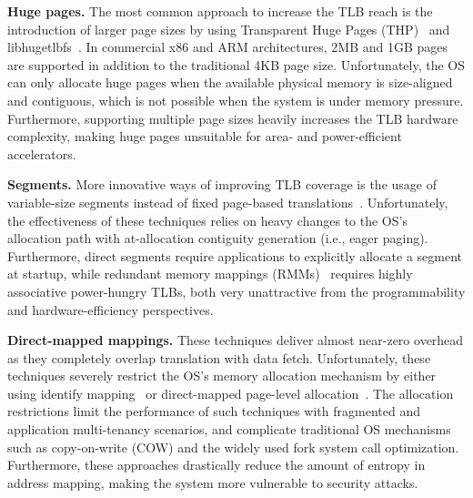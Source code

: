 \noindent\textbf{Huge pages.} The most common approach to increase the TLB reach is the introduction of larger page sizes by using Transparent Huge Pages (THP)~\cite{transparenthugepages} and libhugetlbfs~\cite{lighugetlbfs}. In commercial x86 and ARM architectures, 2MB and 1GB pages are supported in addition to the traditional 4KB page size. Unfortunately, the OS can only allocate huge pages when the available physical memory is size-aligned and contiguous, which is not possible when the system is under memory pressure. Furthermore, supporting multiple page sizes heavily increases the TLB hardware complexity, making huge pages unsuitable for area- and power-efficient accelerators.

\noindent\textbf{Segments.} More innovative ways of improving TLB coverage is the usage of variable-size segments instead of fixed page-based translations~\cite{karakostas:redundant, park:hybrid, basu:efficient}. Unfortunately, the effectiveness of these techniques relies on heavy changes to the OS's allocation path with at-allocation contiguity generation (i.e., eager paging). Furthermore, direct segments require applications to explicitly allocate a segment at startup, while redundant memory mappings (RMMs)~\cite{karakostas:redundant} requires highly associative power-hungry TLBs, both very unattractive from the programmability and hardware-efficiency perspectives.

\noindent\textbf{Direct-mapped mappings.} These techniques deliver almost near-zero overhead as they completely overlap translation with data fetch. Unfortunately, these techniques severely restrict the OS's memory allocation mechanism by either using identify mapping~\cite{haria:devirtualizing} or direct-mapped page-level allocation~\cite{picorel:near-memory}. The allocation restrictions limit the performance of such techniques with fragmented and application multi-tenancy scenarios, and complicate traditional OS mechanisms such as copy-on-write (COW) and the widely used fork system call optimization. Furthermore, these approaches drastically reduce the amount of entropy in address mapping, making the system more vulnerable to security attacks.


